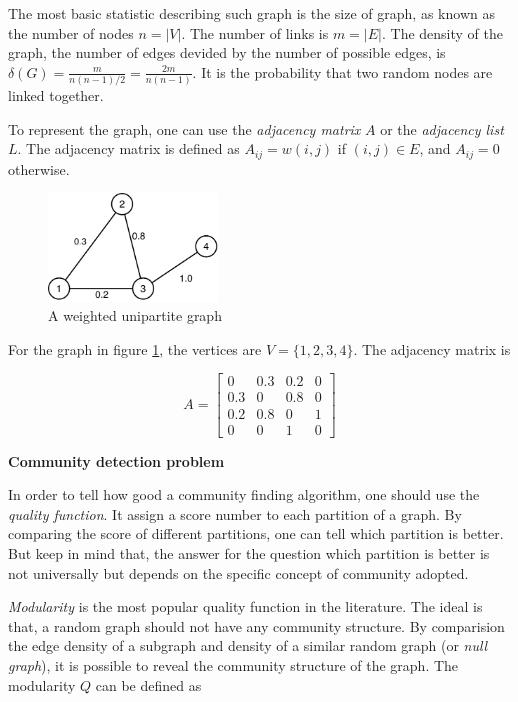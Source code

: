 The most basic statistic describing such graph is the size of graph, as known as the number of nodes $n = |V|$.
The number of links is $m = |E|$.
The density of the graph, the number of edges devided by the number of possible edges, is $\delta(G) = \frac{m}{n(n-1)/2} = \frac{2m}{n(n-1)}$.
It is the probability that two random nodes are linked together.

To represent the graph, one can use the \textit{adjacency matrix} $A$ or the \textit{adjacency list} $L$.
The adjacency matrix is defined as $A_{ij} = w(i, j)$ if $(i, j) \in E$, and $A_{ij} = 0$ otherwise.

\begin{figure}[H]
	\centering
	\includegraphics[width=0.4\textwidth]{images/weighted-unipartite.pdf}
	\caption{A weighted unipartite graph}
	\label{fig:weighted-unipartite-graph}
\end{figure}

For the graph in figure \ref{fig:weighted-unipartite-graph},
the vertices are $V = \{1, 2, 3, 4\}$.
The adjacency matrix is

\begin{equation*}
	A =
	\begin{bmatrix}
		0   & 0.3 & 0.2 & 0 \\
		0.3 & 0   & 0.8 & 0 \\
		0.2 & 0.8 & 0   & 1 \\
		0   & 0   & 1   & 0
	\end{bmatrix}
\end{equation*}

\textbf{Community detection problem}

In order to tell how good a community finding algorithm, one should use the \textit{quality function}.
It assign a score number to each partition of a graph.
By comparing the score of different partitions, one can tell which partition is better.
But keep in mind that, the answer for the question which partition is better is not universally
but depends on the specific concept of community adopted.

\textit{Modularity}\parencite{newman2004} is the most popular quality function in the literature.
The ideal is that, a random graph should not have any community structure.
By comparision the edge density of a subgraph and density of a similar random graph (or \textit{null graph}),
it is possible to reveal the community structure of the graph.
The modularity $Q$ can be defined as

